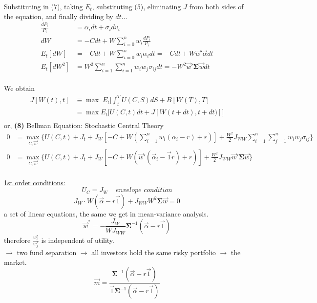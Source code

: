 \documentclass[
14pt,notheorems,hyperref={pdfauthor=whatever}
]{beamer}
\begin{document}
\begin{frame}
Substituting in (7), taking $E_t$, substituting (5), eliminating $J$ from both sides of the equation, and finally dividing by $dt$...\\
\begin{align*}
    \frac{dP_i}{P_i} &= \alpha_i dt + \sigma_i dv_i\\
    dW &= -C dt + W\sum_{i=0}^n w_i \frac{dP_i}{P_i}\\
    E_t[dW] &= -C dt + W \sum_{i=0}^n w_i\alpha_i dt = -C dt + W \vec{w}'\vec{\alpha} dt\\
    E_t[dW^2] &= W^2 \sum_{i=1}^n \sum_{i=1}^n w_i w_j \sigma_{ij} dt = -W^2 \vec{w}'\bm{\Sigma}\vec{w} dt\\
\end{align*}
\end{frame}

\begin{frame}
We obtain
\begin{align*}
    J[W(t),t] &\equiv \max\;E_t \Bigg[ \int_t^T U(C,S)dS + B[W(T),T]\\
    &= \max E_t \Bigg[U(C,t)dt + J[W(t+dt),t+dt)]\Bigg]\\
\end{align*}
or, \textbf{(8)} Bellman Equation: Stochastic Central Theory\\
\begin{align*}
    0 &= \max_{C,\vec{w}} \Bigg\{ U(C,t)+J_t+J_W[-C+W(\sum_{i=1}^n w_i(\alpha_i-r)+r)] + \frac{W^2}{2} J_{WW} \sum_{i=1}^n \sum_{j=1}^n w_i w_j \sigma_{ij} \Bigg\}\\
    0 &= \max_{C,\vec{w}} \Bigg\{ U(C,t)+J_t+J_W[-C+W(\vec{w}'(\vec{\alpha}_i-\vec{1}r)+r)] + \frac{W^2}{2} J_{WW} \vec{w}' \bm{\Sigma} \vec{w} \Bigg\}\\
\end{align*}
\end{frame}

\begin{frame}
\underline{1st order conditions:}\\
\begin{equation} \tag{9a}
    U_C = J_W \;\;\;\; \textit{envelope condition}
\end{equation}
\begin{equation} \tag{9b}
    J_W \cdot W(\vec{\alpha}-r\vec{1}) + J_{WW} W^2 \bm{\Sigma} \vec{w} = 0
\end{equation}
a set of linear equations, the same we get in mean-variance analysis.\\
\begin{equation} \tag{10}
    \vec{w}^* = -\frac{J_W}{W J_{WW}} \bm{\Sigma}^{-1}(\vec{\alpha} - r\vec{1})
\end{equation}
therefore $\frac{w_i^*}{w_j^*}$ is independent of utility.\\
$\longrightarrow$ two fund separation $\longrightarrow$ all investors hold the same risky portfolio $\longrightarrow$ the market.\\
\[\vec{m} = \frac{\bm{\Sigma}^{-1}(\vec{\alpha}-r\vec{1})}{\vec{1} \bm{\Sigma}^{-1}(\vec{\alpha}-r\vec{1})}\]
\end{frame}
\end{document}
